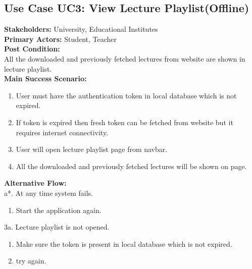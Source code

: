 \subsection{Use Case UC3: View Lecture Playlist(Offline)}
\textbf{Stakeholders: } University, Educational Institutes \\
\textbf{Primary Actors: } Student, Teacher \\
\textbf{Post Condition: }\\
All the downloaded and previously fetched lectures from website are shown in lecture playlist.\\
\textbf{Main Success Scenario: }
\begin{enumerate}
\item User must have the authentication token in local database which is not expired.
\item If token is expired then fresh token can be fetched from website but it requires internet connectivity.
\item User will open lecture playlist page from navbar.
\item All the downloaded and previously fetched lectures will be shown on page. 
\end{enumerate}
\textbf{Alternative Flow: }\\
a*. At any time system fails.
\begin{enumerate}
\item Start the application again.
\end{enumerate}
3a. Lecture playlist is not opened.
\begin{enumerate}
\item Make sure the token is present in local database which is not expired.
\item try again.
\end{enumerate}





